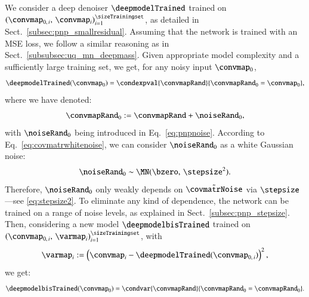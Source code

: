 \documentclass{aa}
\begin{document}
We consider a deep denoiser $\deepmodelTrained$ trained on $(\convmap_{0,\, i},\, \convmap_i)_{i=1}^{\sizeTrainingset}$, as detailed in Sect.~\ref{subsec:pnp_smallresidual}. Assuming that the network is trained with an MSE loss, we follow a similar reasoning as in Sect.~\ref{subsubsec:uq_mn_deepmass}. Given appropriate model complexity and a sufficiently large training set, we get, for any noisy input $\convmap_0$,
\begin{equation}
    \deepmodelTrained(\convmap_0) = \condexpval{\convmapRand}{\convmapRand_0=\convmap_0},
\label{eq:approx_pmean_denoiser}
\end{equation}
where we have denoted:
\begin{equation}
    \convmapRand_0 := \convmapRand + \noiseRand_0,
\label{eq:convmaprand0}
\end{equation}
with $\noiseRand_0$ being introduced in Eq.~\eqref{eq:pnpnoise}. According to Eq.~\eqref{eq:covmatrwhitenoise}, we can consider $\noiseRand_0$ as a white Gaussian noise:
\begin{equation}
    \noiseRand_0 \sim \MN(\bzero,\, \stepsize^2).
\end{equation}
Therefore, $\noiseRand_0$ only weakly depends on $\tilde\covmatrNoise$ via $\stepsize$---see \eqref{eq:stepsize2}. To eliminate any kind of dependence, the network can be trained on a range of noise levels, as explained in Sect.~\ref{subsec:pnp_stepsize}.
Then, considering a new model $\deepmodelbisTrained$ trained on $(\convmap_{0,\, i},\, \varmap_i)_{i=1}^{\sizeTrainingset}$, with
\begin{equation}
    \varmap_i := \left(
        \convmap_i - \deepmodelTrained(\convmap_{0,\, i})
    \right)^2,
\label{eq:groundtruth_order2}
\end{equation}
we get:
\begin{equation}
    \deepmodelbisTrained(\convmap_0) = \condvar{\convmapRand}{\convmapRand_0=\convmapRand_0}.
\label{eq:approx_pvar_denoiser}
\end{equation}
\end{document}
